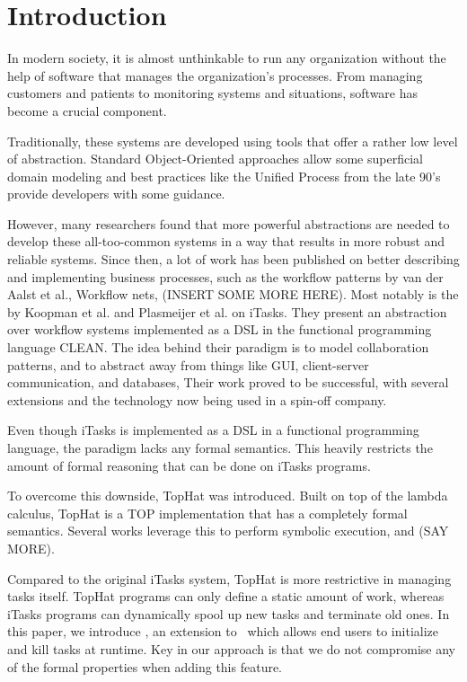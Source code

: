 
\section{Introduction}
\label{sec:introduction}

In modern society, it is almost unthinkable to run any organization without the help of software that manages the organization's processes.
From managing customers and patients to monitoring systems and situations, software has become a crucial component.

Traditionally, these systems are developed using tools that offer a rather low level of abstraction.
Standard Object-Oriented approaches allow some superficial domain modeling and best practices like the Unified Process from the late 90's provide developers with some guidance.

However, many researchers found that more powerful abstractions are needed to develop these all-too-common systems in a way that results in more robust and reliable systems.
Since then, a lot of work has been published on better describing and implementing business processes, such as the workflow patterns by van der Aalst et al., Workflow nets, (INSERT SOME MORE HERE).
Most notably is the by Koopman et al. and Plasmeijer et al. on iTasks.
They present an abstraction over workflow systems implemented as a DSL in the functional programming language CLEAN.
The idea behind their paradigm is to model collaboration patterns, and to abstract away from things like GUI, client-server communication, and databases,
Their work proved to be successful, with several extensions and the technology now being used in a spin-off company.

Even though iTasks is implemented as a DSL in a functional programming language, the paradigm lacks any formal semantics.
This heavily restricts the amount of formal reasoning that can be done on iTasks programs.

To overcome this downside, TopHat was introduced.
Built on top of the lambda calculus, TopHat is a TOP implementation that has a completely formal semantics.
Several works leverage this to perform symbolic execution, and (SAY MORE).

Compared to the original iTasks system, TopHat is more restrictive in managing tasks itself.
TopHat programs can only define a static amount of work, whereas iTasks programs can dynamically spool up new tasks and terminate old ones.
In this paper, we introduce \DYNTOPHAT, an extension to \TOPHAT\ which allows end users to initialize and kill tasks at runtime.
Key in our approach is that we do not compromise any of the formal properties when adding this feature.

